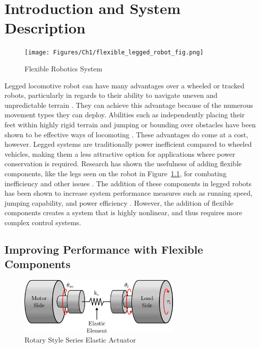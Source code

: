 \chapter{Introduction and System Description}
\label{chapter1}
% 
\begin{figure}[b!]
  \centering
    \texttt{[image: Figures/Ch1/flexible\_legged\_robot\_fig.png]}
    \caption{Flexible Robotics System}
    \label{fig:flexible_system}
\end{figure}
% 

Legged locomotive robot can have many advantages over a wheeled or tracked robots, particularly in regards to their ability to navigate uneven and unpredictable terrain \cite{Park2017,Seok2015}. They can achieve this advantage because of the numerous movement types they can deploy. Abilities such as independently placing their feet within highly rigid terrain and jumping or bounding over obstacles have been shown to be effective ways of locomoting \cite{Blackman2018}. These advantages do come at a cost, however. Legged systems are traditionally power inefficient compared to wheeled vehicles, making them a less attractive option for applications where power conservation is required. Research has shown the usefulness of adding flexible components, like the legs seen on the robot in Figure~\ref{fig:flexible_system}, for combating inefficiency and other issues \cite{Sugiyama2004,Galloway2011,Seok2015}. The addition of these components in legged robots has been shown to increase system performance measures such as running speed, jumping capability, and power efficiency \cite{Hurst2008}. However, the addition of flexible components creates a system that is highly nonlinear, and thus requires more complex control systems.  


\section{Improving Performance with Flexible Components}
%
\begin{figure}[b!]
  \centering
    \includegraphics[width=0.7\textwidth]{Figures/Ch1/SEA.png}
    \caption{Rotary Style Series Elastic Actuator}
    \label{fig:SEA}
\end{figure}

